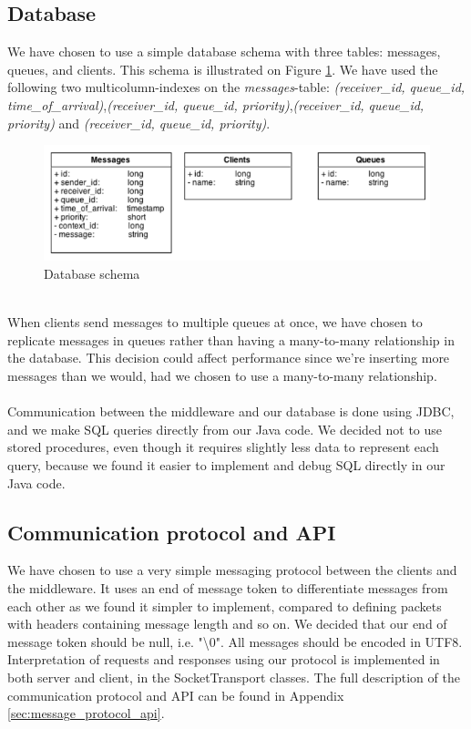 \documentclass{article}
\begin{document}
        \subsection{Database}
            We have chosen to use a simple database schema with three tables: messages, queues, and clients. This schema is illustrated on Figure \ref{fig:database_schema}. We have used the following two multicolumn-indexes on the \textit{messages}-table: \textit{(receiver\_id, queue\_id, time\_of\_arrival)},\textit{(receiver\_id, queue\_id, priority)},\textit{(receiver\_id, queue\_id, priority)} and \textit{(receiver\_id, queue\_id, priority)}. 
            \begin{figure}[H]
                \centering
                \centerline{\includegraphics[scale=0.50]{database_schema}}
                \caption{Database schema}
                \label{fig:database_schema}
            \end{figure}
            ~\\
            When clients send messages to multiple queues at once, we have chosen to replicate messages in queues rather than having a many-to-many relationship in the database. This decision could affect performance since we're inserting more messages than we would, had we chosen to use a many-to-many relationship.\\
            \\
            Communication between the middleware and our database is done using JDBC, and we make SQL queries directly from our Java code. We decided not to use stored procedures, even though it requires slightly less data to represent each query, because we found it easier to implement and debug SQL directly in our Java code.

        \subsection{Communication protocol and API}
            We have chosen to use a very simple messaging protocol between the clients and the middleware. It uses an end of message token to differentiate messages from each other as we found it simpler to implement, compared to defining packets with headers containing message length and so on. We decided that our end of message token should be null, i.e. "\textbackslash0". All messages should be encoded in UTF8.\\
            Interpretation of requests and responses using our protocol is implemented in both server and client, in the SocketTransport classes. The full description of the communication protocol and API can be found in Appendix \ref{sec:message_protocol_api}.
\end{document}
